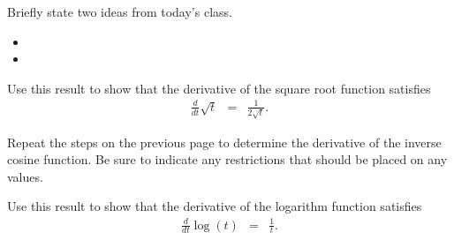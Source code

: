 \begin{problem}
\item Briefly state two ideas from today's class.
  \begin{itemize}
  \item 
  \item 
  \end{itemize}

\item Use this result to show that the derivative of the square root
  function satisfies
  \begin{eqnarray*}
    \frac{d}{dt} \sqrt{t} & = & \frac{1}{2\sqrt{t}}.
  \end{eqnarray*}

  \vfill

\item Repeat the steps on the previous page to determine the
  derivative of the inverse cosine function. Be sure to indicate any
  restrictions that should be placed on any values.

  \vfill

\item Use this result to show that the derivative of the logarithm
  function satisfies
  \begin{eqnarray*}
    \frac{d}{dt} \log(t) & = & \frac{1}{t}.
  \end{eqnarray*}

  \vfill


\end{problem}





